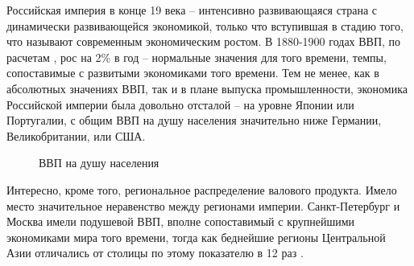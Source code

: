 \documentclass[a4paper,12pt]{article}
\begin{document}

Российская империя в конце 19 века -- интенсивно развивающаяся страна с динамически развивающейся экономикой, только что вступившая в стадию того, что называют современным экономическим ростом. В 1880-1900 годах ВВП, по расчетам \citet{gregory_russian_1983}, рос на 2\% в год – нормальные значения для того времени, темпы, сопоставимые с развитыми экономиками того времени. Тем не менее, как в абсолютных значениях ВВП, так и в плане выпуска промышленности, экономика Российской империи была довольно отсталой – на уровне Японии или Португалии, с общим ВВП на душу населения значительно ниже Германии, Великобритании, или США.

\begin{figure}[h!]
	\centering
	\caption{ВВП на душу населения \citep{maddison_project_2018}}
	
\end{figure}

Интересно, кроме того, региональное распределение валового продукта. Имело место значительное неравенство между регионами империи. Санкт-Петербург и Москва имели подушевой ВВП, вполне сопоставимый с крупнейшими экономиками мира того времени, тогда как беднейшие регионы Центральной Азии отличались от столицы по этому показателю в 12 раз \citep{markevich_regional_2019}.
\end{document}
